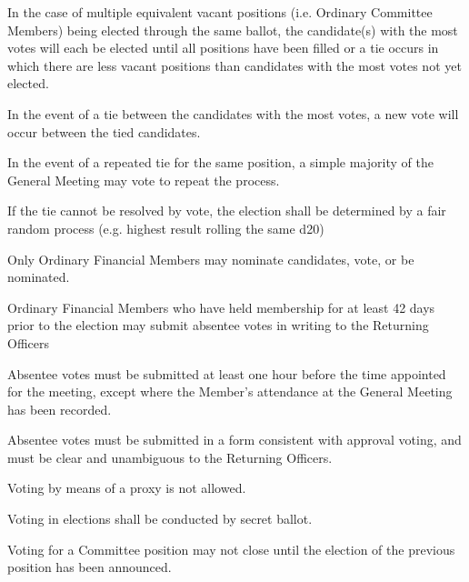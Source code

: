 \documentclass[a4paper]{article}
\begin{document}
\begin{myEnumerate}
        \begin{myEnumerate}
            \item In the case of multiple equivalent vacant positions (i.e. Ordinary Committee Members) being elected through the same ballot, the candidate(s) with the most votes will each be elected until all positions have been filled or a tie occurs in which there are less vacant positions than candidates with the most votes not yet elected.
            \item In the event of a tie between the candidates with the most votes, a new vote will occur between the tied candidates.
            \item In the event of a repeated tie for the same position, a simple majority of the General Meeting may vote to repeat the process.
            \item If the tie cannot be resolved by vote, the election shall be determined by a fair random process (e.g. highest result rolling the same d20)
        \end{myEnumerate}
    \item Only Ordinary Financial Members may nominate candidates, vote, or be nominated.
        \begin{myEnumerate}
            \item Ordinary Financial Members who have held membership for at least 42 days prior to the election may submit absentee votes in writing to the Returning Officers
                \begin{myEnumerate}
                    \item Absentee votes must be submitted at least one hour before the time appointed for the meeting, except where the Member’s attendance at the General Meeting has been recorded.
                    \item Absentee votes must be submitted in a form consistent with approval voting, and must be clear and unambiguous to the Returning Officers.
                \end{myEnumerate}
            \item Voting by means of a proxy is not allowed.
        \end{myEnumerate}
    \item Voting in elections shall be conducted by secret ballot.
    \item Voting for a Committee position may not close until the election of the previous position has been announced.
\end{myEnumerate}
\end{document}
